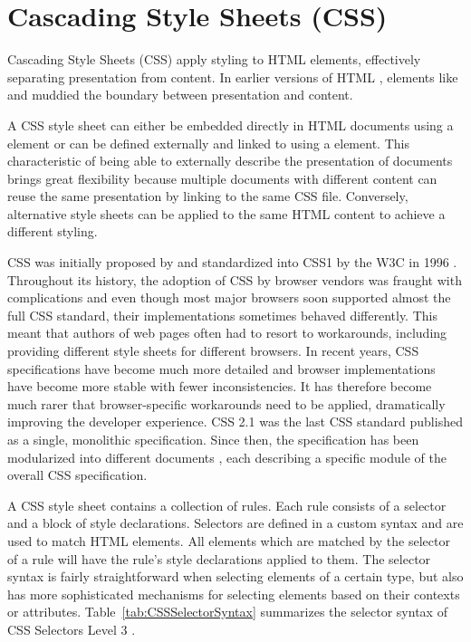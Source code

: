 \section{Cascading Style Sheets (CSS)}
\label{sec:CSS}

Cascading Style Sheets (CSS) apply styling to HTML elements,
effectively separating presentation from content. In earlier versions
of HTML \parencite{HTML32}, elements like  and
 muddied the boundary between presentation and content.

A CSS style sheet can either be embedded directly in HTML documents
using a  element or can be defined externally and
linked to using a  element. This characteristic of
being able to externally describe the presentation of documents brings
great flexibility because multiple documents with different content
can reuse the same presentation by linking to the same CSS file.
Conversely, alternative style sheets can be applied to the same HTML
content to achieve a different styling.

CSS was initially proposed by \textcite{CSSProposal} and standardized
into CSS1 by the W3C in 1996 \parencite{CSS1}. Throughout its history,
the adoption of CSS by browser vendors was fraught with complications
and even though most major browsers soon supported almost the full CSS
standard, their implementations sometimes behaved differently. This
meant that authors of web pages often had to resort to workarounds,
including providing different style sheets for different browsers. In
recent years, CSS specifications have become much more detailed
\parencite{CSS21} and browser implementations have become more stable
with fewer inconsistencies. It has therefore become much rarer that
browser-specific workarounds need to be applied, dramatically
improving the developer experience. CSS 2.1 \parencite{CSS21} was the
last CSS standard published as a single, monolithic
specification. Since then, the specification has been modularized into
different documents \parencite{CSSSnapshot2020}, each describing a
specific module of the overall CSS specification.
 

A CSS style sheet contains a collection of rules. Each rule consists
of a selector and a block of style declarations. Selectors are defined
in a custom syntax and are used to match HTML elements. All elements
which are matched by the selector of a rule will have the rule's style
declarations applied to them. The selector syntax is fairly
straightforward when selecting elements of a certain type, but also
has more sophisticated mechanisms for selecting elements based on
their contexts or attributes. Table~\ref{tab:CSSSelectorSyntax}
summarizes the selector syntax of CSS Selectors Level 3
\parencite{CSSSelectors3}.




